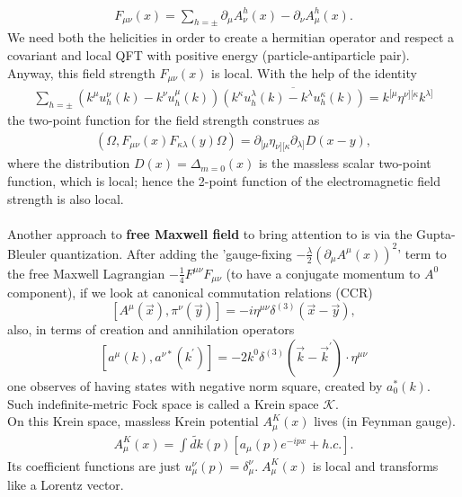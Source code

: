 \documentclass[12pt,a4paper]{article}
\numberwithin{equation}{section}
\begin{document}
\begin{align*}
F_{\mu\nu}(x)=\sum_{h=\pm}\partial_\mu A_\nu^h(x)-\partial_\nu A_\mu^h(x).
\end{align*} 
We need both the helicities in order to create a hermitian operator and respect a covariant and local QFT with positive energy (particle-antiparticle pair).\\
Anyway, this field strength $F_{\mu\nu}(x)$ is local. With the help of the identity
\begin{align}\label{eq:2.8}
\sum_{h=\pm}\left(k^{\mu} u_{h}^{\nu}(k)-k^{\nu} u_{h}^{\mu}(k)\right) \overline{\left(k^{\kappa} u_{h}^{\lambda}(k)-k^{\lambda} u_{h}^{\kappa}(k)\right)}=k^{[\mu} \eta^{\nu][\kappa} k^{\lambda]}
\end{align}
the two-point function for the field strength construes as
\begin{align}\label{eq:2.9}
\left(\Omega, F_{\mu \nu}(x) F_{\kappa \lambda}(y) \Omega\right)=\partial_{[\mu} \eta_{\nu][\kappa} \partial_{\lambda]} D(x-y),
\end{align}
where the distribution $D(x)=\Delta_{m=0}(x)$ is the massless scalar two-point function, which is local; hence the 2-point function of the electromagnetic field strength is also local. \\\\
Another approach to \textbf{\textcolor{blue!50!black}{free Maxwell field}} to bring attention to is via the Gupta-Bleuler quantization. After adding the 'gauge-fixing $-\frac{\lambda}{2}(\partial_\mu A^\mu(x))^2$' term to the free Maxwell Lagrangian $-\frac{1}{4}F^{\mu\nu}F_{\mu\nu}$ (to have a conjugate momentum to $A^0$ component), if we look at canonical commutation relations (CCR)
$$
\left[A^{\mu}(\vec{x}), \pi^{\nu}(\vec{y})\right]=-i \eta^{\mu \nu} \delta^{(3)}(\vec{x}-\vec{y}),
$$
also, in terms of creation and annihilation operators  
$$
\left[a^{\mu}(k), a^{\nu *}\left(k^{\prime}\right)\right]=-2 k^{0} \delta^{(3)}\left(\vec{k}-\vec{k}^{\prime}\right) \cdot \eta^{\mu \nu}
$$
one observes of having states with negative norm square, created by $a^*_0(k)$. Such indefinite-metric Fock space is called a Krein space $\mathcal{K}$. \\
On this Krein space, massless Krein potential $A^K_\mu(x)$ lives (in Feynman gauge).
\begin{align}\label{eq:2.110}
A^K_{\mu}(x)=\int  \widetilde{dk}(p)\left[a_{\mu}(p) e^{-i p x}+h . c .\right].
\end{align}
Its coefficient functions are just $u_{\mu}^{\nu}(p)=\delta_{\mu}^{\nu}.\; A^K_{\mu}(x)$ is local and transforms like a Lorentz vector. \\
\end{document}
